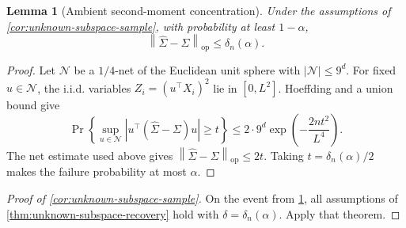 \documentclass[10pt]{article}
\theoremstyle{plain}
\newtheorem{lemma}[theorem]{Lemma}
\theoremstyle{definition}
\theoremstyle{remark}
\newcommand{\opnorm}[1]{\left\lVert #1\right\rVert_{\operatorname{op}}}
\newcommand{\Sigmahat}{\widehat\Sigma}
\begin{document}
\begin{lemma}[Ambient second-moment concentration]
\label{lem:ambient-concentration}
Under the assumptions of \cref{cor:unknown-subspace-sample}, with probability
at least \(1-\alpha\),
\[
  \opnorm{\Sigmahat-\Sigma}\le\delta_n(\alpha).
\]
\end{lemma}

\begin{proof}
Let \(\mathcal N\) be a \(1/4\)-net of the Euclidean unit sphere with
\(|\mathcal N|\le9^d\).  For fixed \(u\in\mathcal N\), the i.i.d. variables
\(Z_i=(u^\top X_i)^2\) lie in \([0,L^2]\).  Hoeffding and a union bound give
\[
  \Pr\left\{
  \sup_{u\in\mathcal N}|u^\top(\Sigmahat-\Sigma)u|\ge t
  \right\}
  \le2\cdot9^d\exp\left(-\frac{2nt^2}{L^4}\right).
\]
The net estimate used above gives
\(\opnorm{\Sigmahat-\Sigma}\le2t\).  Taking
\(t=\delta_n(\alpha)/2\) makes the failure probability at most \(\alpha\).
\end{proof}

\begin{proof}[Proof of \cref{cor:unknown-subspace-sample}]
On the event from \cref{lem:ambient-concentration}, all assumptions of
\cref{thm:unknown-subspace-recovery} hold with
\(\delta=\delta_n(\alpha)\).  Apply that theorem.
\end{proof}
\end{document}
